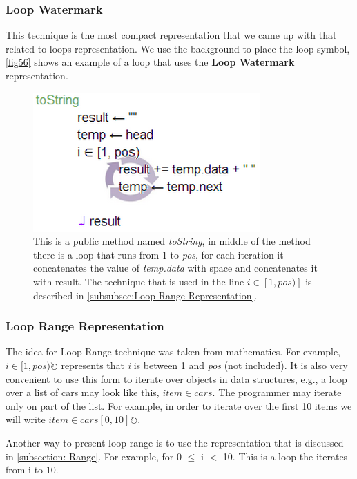 \subsubsection{Loop Watermark}
This technique is the most compact representation that we came up with that related to loops representation. We use the background to place the loop symbol, \autoref{fig56} shows an example of a loop that uses the \textbf{Loop Watermark} representation.
\begin{figure}[H]
	\includegraphics{"./fig/Loop Watermark"}
	\caption{This is a public method named \textit{toString}, in middle of the method there is a loop that runs from 1 to \textit{pos}, for each iteration it concatenates the value of \textit{temp.data} with space and concatenates it with result. The technique that is used in the line $ i \in [1, pos)] $ is described in \autoref{subsubsec:Loop Range Representation}.}
	\label{fig56}
\end{figure}
\subsubsection{Loop Range Representation} \label{subsubsec:Loop Range Representation}
The idea for Loop Range technique was taken from mathematics. For example, $ i \in [1, pos) \circlearrowright $ represents that \textit{i} is between 1 and \textit{pos} (not included). It is also very convenient to use this form to iterate over objects in data structures, e.g., a loop over a list of cars may look like this, $ item \in cars $. The programmer may iterate only on part of the list. For example, in order to iterate over the first 10 items we will write $ item \in cars[0, 10] \circlearrowright $.

Another way to present loop range is to use the representation that is discussed in \autoref{subsection: Range}. For example, for 0 $ \leq $ i $ < $ 10. This is a loop the iterates from i to 10.
